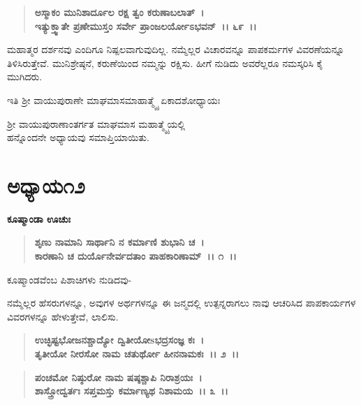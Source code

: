 \begin{verse}
\textbf{ಅಸ್ಮಾಕಂ ಮುನಿಶಾರ್ದೂಲ ರಕ್ಷ ತ್ವಂ ಕರುಣಾಬಲಾತ್~।}\\\textbf{ಇತ್ಯುಕ್ತ್ವಾತೇ ಪ್ರಣೇಮುಸ್ತಂ ಸರ್ವೇ ಪ್ರಾಂಜಲರ್ಯೋಽಭವನ್~।। ೬೯~।।}
\end{verse}

ಮಹಾತ್ಮರ ದರ್ಶನವು ಎಂದಿಗೂ ನಿಷ್ಪಲವಾಗುವುದಿಲ್ಲ. ನಮ್ಮೆಲ್ಲರ ವಿಚಾರವನ್ನೂ ಪಾಪಕರ್ಮಗಳ ವಿವರಣೆಯನ್ನೂ ತಿಳಿಸಿರುತ್ತೇವೆ. ಮುನಿಶ್ರೇಷ್ಠನೆ, ಕರುಣೆಯಿಂದ ನಮ್ಮನ್ನು ರಕ್ಷಿಸು. ಹೀಗೆ ನುಡಿದು ಅವರೆಲ್ಲರೂ ನಮಸ್ಕರಿಸಿ ಕೈ ಮುಗಿದರು.

\begin{center}
ಇತಿ ಶ‍್ರೀ ವಾಯುಪುರಾಣೇ ಮಾಘಮಾಸಮಾಹಾತ್ಮ್ಯೈ ಏಕಾದಶೋಧ್ಯಾಯಃ 
\end{center}

\begin{center}
ಶ‍್ರೀ ವಾಯುಪುರಾಣಾಂತರ್ಗತ ಮಾಘಮಾಸ ಮಹಾತ್ಮ್ಯೈಯಲ್ಲಿ \\ ಹನ್ನೊಂದನೇ ಅಧ್ಯಾಯವು ಸಮಾಪ್ತಿಯಾಯಿತು.
\end{center}

\newpage

\section*{ಅಧ್ಯಾಯ\enginline{-}೧೨}

\begin{flushleft}
\textbf{ಕೂಷ್ಮಾಂಡಾ ಊಚುಃ\enginline{-}}
\end{flushleft}

\begin{verse}
\textbf{ಶೃಣು ನಾಮಾನಿ ಸಾರ್ಥಾನಿ ನ ಕರ್ಮಾಣಿ ಶುಭಾನಿ ಚ~।}\\\textbf{ಕಾರಣಾನಿ ಚ ದುರ್ಯೊನೇರ್ವದತಾಂ ಪಾಹಕಾರಿಣಾಮ್~।। ೧~।। }
\end{verse}

\begin{flushleft}
ಕೂಷ್ಮಾಂಡವೆಂಬ ಪಿಶಾಚಿಗಳು ನುಡಿದವು-
\end{flushleft}

ನಮ್ಮೆಲ್ಲರ ಹೆಸರುಗಳನ್ನೂ, ಅವುಗಳ ಅರ್ಥಗಳನ್ನೂ ಈ ಜನ್ಮದಲ್ಲಿ ಉತ್ಪನ್ನರಾಗಲು ನಾವು ಆಚರಿಸಿದ ಪಾಪಕಾರ್ಯಗಳ ವಿವರಗಳನ್ನೂ ಹೇಳುತ್ತೇವೆ, ಲಾಲಿಸು.

\begin{verse}
\textbf{ಉಚ್ಛಿಷ್ಟಭೋಜನಶ್ಚಾದ್ಯೋ ದ್ವಿತೀಯೋsಭದ್ರಸಂಜ್ಞ ಕಃ~।}\\\textbf{ತೃತೀಯೋ ನೀರಸೋ ನಾಮ ಚತುರ್ಥೋ ಹೀನನಾಮಕಃ~।। ೨~।। }
\end{verse}

\begin{verse}
\textbf{ಪಂಚಮೋ ನಿಷ್ಠುರೋ ನಾಮ ಷಷ್ಠಶ್ಚಾಪಿ ನಿರಾಶ್ರಯಃ~।}\\\textbf{ಶಾಸ್ತ್ರೋದ್ವರ್ತಃ ಸಪ್ತಮಸ್ತು ಕರ್ಮಾಣ್ಯಥ ನಿಶಾಮಯ~।। ೩~।।}
\end{verse}

